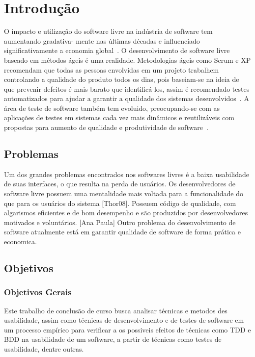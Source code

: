 	\chapter{Introdução}

	O impacto e utilização do software livre na indústria de software tem aumentando gradativa-
	mente nas últimas décadas e influenciado significativamente a economia global~\cite{benkler2006}. 
	O desenvolvimento de software livre baseado em métodos ágeis é uma realidade. Metodologias ágeis 
	como Scrum e XP recomendam que todas as pessoas envolvidas em um projeto trabalhem controlando a 
	qualidade do produto todos os dias, pois baseiam-se na ideia de que prevenir defeitos é mais barato
	que identificá-los, assim é recomendado testes automatizados para ajudar a garantir a qualidade dos 
	sistemas desenvolvidos~\cite{bernardo2011}.
	A área de teste de software também tem evoluido, preocupando-se com as aplicações de testes
	em sistemas cada vez mais dinâmicos e reutilizáveis com propostas para aumento de qualidade
	e produtividade de software~\cite{vicente2010}.
	\section{Problemas}
	Um dos grandes problemas encontrados nos softwares livres é a baixa usabilidade de suas interfaces, o que resulta na perda de usuários. 
	Os desenvolvedores de software livre possuem uma mentalidade mais voltada para a funcionalidade do que para os usuários do sistema [Thor08]. Possuem código de qualidade, com algarismos eficientes e de bom desempenho e são produzidos por desenvolvedores motivados e voluntários. [Ana Paula] 
	Outro problema do desenvolvimento de software atualmente está em garantir qualidade de software de 
	forma prática e economica.

	\section{Objetivos}

	\subsection{Objetivos Gerais}
	 
	Este trabalho de conclusão de curso busca analisar técnicas e metodos des usabilidade, assim como técnicas de desenvolvimento e de testes de software em um processo empírico para verificar a os possiveis efeitos de técnicas como TDD e BDD na usabilidade de um software, a partir de técnicas como testes de usabilidade, dentre outras.
	
